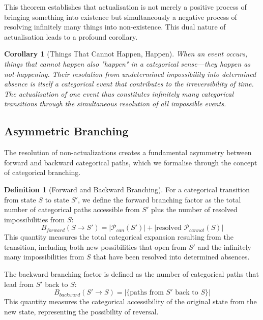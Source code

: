 \documentclass[12pt,a4paper]{article}
\newtheorem{corollary}[theorem]{Corollary}
\theoremstyle{definition}
\newtheorem{definition}[theorem]{Definition}
\theoremstyle{remark}
\begin{document}
This theorem establishes that actualisation is not merely a positive process of bringing something into existence but simultaneously a negative process of resolving infinitely many things into non-existence. This dual nature of actualisation leads to a profound corollary.

\begin{corollary}[Things That Cannot Happen, Happen]
When an event occurs, things that cannot happen also "happen" in a categorical sense—they happen as not-happening. Their resolution from undetermined impossibility into determined absence is itself a categorical event that contributes to the irreversibility of time. The actualisation of one event thus constitutes infinitely many categorical transitions through the simultaneous resolution of all impossible events.
\end{corollary}

\subsection{Asymmetric Branching}

The resolution of non-actualizations creates a fundamental asymmetry between forward and backward categorical paths, which we formalise through the concept of categorical branching.

\begin{definition}[Forward and Backward Branching]
For a categorical transition from state $S$ to state $S'$, we define the forward branching factor as the total number of categorical paths accessible from $S'$ plus the number of resolved impossibilities from $S$:
\begin{equation}
B_{forward}(S \to S') = |\mathcal{P}_{can}(S')| + |\text{resolved } \mathcal{P}_{cannot}(S)|
\end{equation}
This quantity measures the total categorical expansion resulting from the transition, including both new possibilities that open from $S'$ and the infinitely many impossibilities from $S$ that have been resolved into determined absences.

The backward branching factor is defined as the number of categorical paths that lead from $S'$ back to $S$:
\begin{equation}
B_{backward}(S' \to S) = |\{\text{paths from } S' \text{ back to } S\}|
\end{equation}
This quantity measures the categorical accessibility of the original state from the new state, representing the possibility of reversal.
\end{definition}
\end{document}
